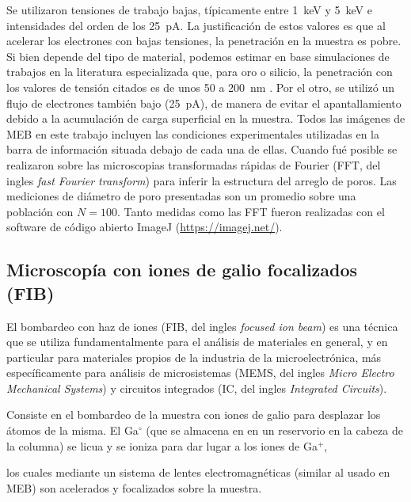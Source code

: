 		Se utilizaron tensiones de trabajo bajas, típicamente entre \SI{1}{\kilo\electronvolt} y \SI{5}{\kilo\electronvolt} e intensidades del orden de los \SI{25}{\pA}. La justificación de estos valores es que al acelerar los electrones con bajas tensiones, la penetración en la muestra es pobre. Si bien depende del tipo de material, podemos estimar en base simulaciones de trabajos en la literatura especializada que, para oro o silicio, la penetración con los valores de tensión citados es de unos 50 a \SI{200}{\nm} \cite{Joy1984,Shur2012,Hafner2007}. Por el otro, se utilizó un flujo de electrones también bajo (\SI{25}{\pA}), de manera de evitar el apantallamiento debido a la acumulación de carga superficial en la muestra. Todos las imágenes de MEB en este trabajo incluyen las condiciones experimentales utilizadas en la barra de información situada debajo de cada una de ellas. Cuando fué posible se realizaron sobre las microscopias transformadas rápidas de Fourier (FFT, del ingles \textit{fast Fourier transform}) para inferir la estructura del arreglo de poros. Las mediciones de diámetro de poro presentadas son un promedio sobre una población con $N=100$. Tanto  medidas como las FFT fueron realizadas con el software de código abierto ImageJ (\url{https://imagej.net/})\cite{ImageJ2012}.

	\subsection{Microscopía con iones de galio focalizados (FIB)}\label{sec:FIB}

		El bombardeo con haz de iones (FIB, del ingles \textit{focused ion beam}) es una técnica que se utiliza fundamentalmente para el análisis de materiales en general, y en particular para materiales propios de la industria de la microelectrónica, más específicamente para análisis de microsistemas (MEMS, del ingles \textit{Micro Electro Mechanical Systems}) y circuitos integrados (IC, del ingles \textit{Integrated Circuits}). 

		Consiste en el bombardeo de la muestra con iones de galio para desplazar los átomos de la misma. El Ga$^{\circ}$ (que se almacena en en un 
		reservorio en la cabeza de la columna) se licua y se ioniza para dar lugar a los iones de Ga${^+}$,
			
		 los cuales mediante un sistema de lentes electromagnéticas (similar al usado en MEB) son acelerados y focalizados sobre la muestra. 


